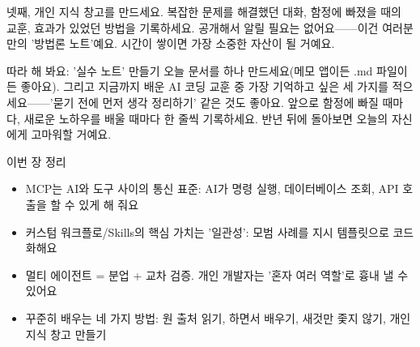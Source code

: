 넷째, 개인 지식 창고를 만드세요. 복잡한 문제를 해결했던 대화, 함정에 빠졌을 때의 교훈, 효과가 있었던 방법을 기록하세요. 공개해서 알릴 필요는 없어요——이건 여러분만의 '방법론 노트'예요. 시간이 쌓이면 가장 소중한 자산이 될 거예요.

\begin{tcbpractice}{따라 해 봐요: '실수 노트' 만들기}
오늘 문서를 하나 만드세요(메모 앱이든 .md 파일이든 좋아요). 그리고 지금까지 배운 AI 코딩 교훈 중 가장 기억하고 싶은 세 가지를 적으세요——'묻기 전에 먼저 생각 정리하기' 같은 것도 좋아요. 앞으로 함정에 빠질 때마다, 새로운 노하우를 배울 때마다 한 줄씩 기록하세요. 반년 뒤에 돌아보면 오늘의 자신에게 고마워할 거예요.

\end{tcbpractice}

\begin{tcbsummary}{이번 장 정리}
\begin{itemize}
  \item MCP는 AI와 도구 사이의 통신 표준: AI가 명령 실행, 데이터베이스 조회, API 호출을 할 수 있게 해 줘요
  \item 커스텀 워크플로/Skills의 핵심 가치는 '일관성': 모범 사례를 지시 템플릿으로 코드화해요
  \item 멀티 에이전트 = 분업 + 교차 검증. 개인 개발자는 '혼자 여러 역할'로 흉내 낼 수 있어요
  \item 꾸준히 배우는 네 가지 방법: 원 출처 읽기, 하면서 배우기, 새것만 좇지 않기, 개인 지식 창고 만들기
\end{itemize}

\end{tcbsummary}
